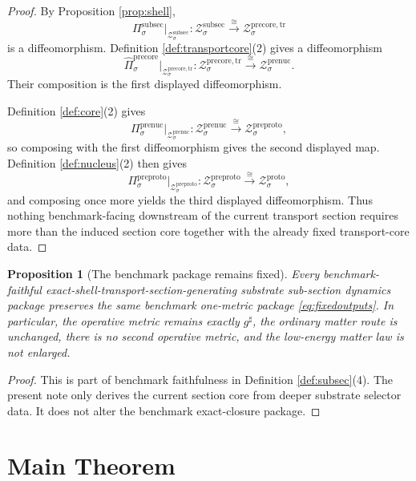 \documentclass[11pt]{article}
\newcommand{\CompletedMetric}{g^{\sharp}}
\newcommand{\ProtoShellSet}[1]{\mathcal Z_{#1}^{\mathrm{proto}}}
\newcommand{\PreProtoProj}[1]{\Pi_{#1}^{\mathrm{preproto}}}
\newcommand{\PreProtoShellSet}[1]{\mathcal Z_{#1}^{\mathrm{preproto}}}
\newcommand{\PreNucProj}[1]{\Pi_{#1}^{\mathrm{prenuc}}}
\newcommand{\PreNucShellSet}[1]{\mathcal Z_{#1}^{\mathrm{prenuc}}}
\newcommand{\PreCoreTrProj}[1]{\widehat{\Pi}_{#1}^{\mathrm{precore}}}
\newcommand{\PreCoreTrShell}[1]{\mathcal Z_{#1}^{\mathrm{precore,tr}}}
\newcommand{\SubSectionProj}[1]{\Pi_{#1}^{\mathrm{subsec}}}
\newcommand{\SubSectionShell}[1]{\mathcal Z_{#1}^{\mathrm{subsec}}}
\newtheorem{proposition}{Proposition}
\begin{document}
\begin{proof}
By Proposition \ref{prop:shell},
\[
\SubSectionProj{\sigma}\big|_{\SubSectionShell{\sigma}}
:
\SubSectionShell{\sigma}\xrightarrow{\cong}\PreCoreTrShell{\sigma}
\]
is a diffeomorphism. Definition \ref{def:transportcore}(2) gives a diffeomorphism
\[
\PreCoreTrProj{\sigma}\big|_{\PreCoreTrShell{\sigma}}
:
\PreCoreTrShell{\sigma}\xrightarrow{\cong}\PreNucShellSet{\sigma}.
\]
Their composition is the first displayed diffeomorphism.

Definition \ref{def:core}(2) gives
\[
\PreNucProj{\sigma}\big|_{\PreNucShellSet{\sigma}}
:
\PreNucShellSet{\sigma}\xrightarrow{\cong}\PreProtoShellSet{\sigma},
\]
so composing with the first diffeomorphism gives the second displayed map. Definition \ref{def:nucleus}(2) then gives
\[
\PreProtoProj{\sigma}\big|_{\PreProtoShellSet{\sigma}}
:
\PreProtoShellSet{\sigma}\xrightarrow{\cong}\ProtoShellSet{\sigma},
\]
and composing once more yields the third displayed diffeomorphism. Thus nothing benchmark-facing downstream of the current transport section requires more than the induced section core together with the already fixed transport-core data.
\end{proof}

\begin{proposition}[The benchmark package remains fixed]
\label{prop:benchmark}
Every benchmark-faithful exact-shell-transport-section-generating substrate sub-section dynamics package preserves the same benchmark one-metric package \eqref{eq:fixedoutputs}. In particular, the operative metric remains exactly \(\CompletedMetric\), the ordinary matter route is unchanged, there is no second operative metric, and the low-energy matter law is not enlarged.
\end{proposition}

\begin{proof}
This is part of benchmark faithfulness in Definition \ref{def:subsec}(4). The present note only derives the current section core from deeper substrate selector data. It does not alter the benchmark exact-closure package.
\end{proof}

\section{Main Theorem}
\end{document}
